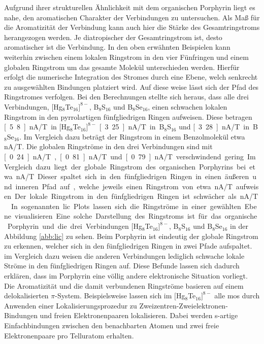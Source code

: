 Aufgrund ihrer strukturellen Ähnlichkeit mit dem organischen Porphyrin liegt es nahe, den aromatischen Charakter der Verbindungen zu untersuchen. Als Maß für die Aromatizität der Verbindung kann auch hier die Stärke des Gesamtringstroms herangezogen werden. Je diatropischer der Gesamtringstrom ist, desto aromatischer ist die Verbindung. In den oben erwähnten Beispielen kann weiterhin zwischen einem lokalen Ringstrom in den vier Fünfringen und einem globalen Ringstrom um das gesamte Molekül unterschieden werden. Hierfür erfolgt die numerische Integration des Stromes durch eine Ebene, welch senkrecht zu ausgewählten Bindungen platziert wird. Auf diese weise lässt sich der Pfad des Ringstromes verfolgen. Bei den Berechnungen stellte sich heraus, dass alle drei Verbindungen, $[$Hg$_8$Te$_{16}]^{8-}$, B$_8$S$_{16}$ und B$_8$Se$_{16}$, einen schwachen lokalen Ringstrom in den pyrrolartigen fünfgliedrigen Ringen aufweisen. Diese betragen \unit[5.8]{nA/T} in $[$Hg$_8$Te$_{16}]^{8-}$ \unit[3.25]{nA/T} in B$_8$S$_{16}$ und \unit[3.28]{nA/T} in B$_8$Se$_{16}$. Im Vergleich dazu beträgt der Ringstrom in einem Benzolmolekül etwa \unit[12]{nA/T}\supercite{fliegl2012aromatic}. Die globalen Ringströme in den drei Verbindungen sind mit \unit[0.24]{nA/T}, \unit[0.81]{nA/T} und \unit[0.79]{nA/T} verschwindend gering. Im Vergleich dazu liegt der globale Ringstrom des organischen Porphyrins bei etwa \unit[27]{nA/T}. Dieser spaltet sich in den fünfgliedrigen Ringen in einen äußeren und inneren Pfad auf, welche jeweils einen Ringstrom von etwa \unit[13]{nA/T} aufweisen. Der lokale Ringstrom in den fünfgliedrigen Ringen ist schwächer als \unit[1]{nA/T}.\supercite{fliegl2012aromatic} In sogenannten \ac{lic} Plots lassen sich die Ringströme in einer gewählten Ebene visualisieren. Eine solche Darstellung des Ringstroms ist für das organische Porphyrin und die drei Verbindungen $[$Hg$_8$Te$_{16}]^{8-}$, B$_8$S$_{16}$ und B$_8$Se$_{16}$ in der Abbildung \ref{abb:lic} zu sehen. Beim Porphyrin ist eindeutig der globale Ringstrom zu erkennen, welcher sich in den fünfgliedrigen Ringen in zwei Pfade aufspaltet. im Vergleich dazu weisen die anderen Verbindungen lediglich schwache lokale Ströme in den fünfgliedrigen Ringen auf.
Diese Befunde lassen sich dadurch erklären, dass im Porphyrin eine völlig andere elektronische Situation vorliegt. Die Aromatizität und die damit verbundenen Ringströme basieren auf einem delokalisierten $\pi$-System. Beispielsweise lassen sich im $[$Hg$_8$Te$_{16}]^{8-}$ alle \acp{mo} durch Anwenden einer Lokalisierungsprozedur\supercite{boys1960sf} zu Zweizentren-Zweielektronen-Bindungen und freien Elektronenpaaren lokalisieren. Dabei werden s-artige Einfachbindungen zwischen den benachbarten Atomen und zwei freie Elektronenpaare pro Telluratom erhalten. 

